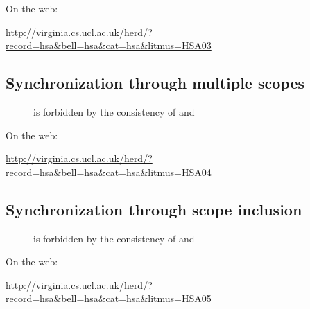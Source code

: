 \documentclass[a4paper]{article}
\begin{document}
On the web:

\url{http://virginia.cs.ucl.ac.uk/herd/?record=hsa&bell=hsa&cat=hsa&litmus=HSA03}

\pagebreak

\subsection{\label{ex04}Synchronization through multiple scopes}


\begin{figure}[htp]
\begin{center}\moveback{}
\end{center}
\caption{\label{hsa04}  is forbidden by the consistency
of \hhb{} and \coh{} \color{red}{(Forbidden)}}
\end{figure}

On the web:

\url{http://virginia.cs.ucl.ac.uk/herd/?record=hsa&bell=hsa&cat=hsa&litmus=HSA04}

\pagebreak

\subsection{Synchronization through scope inclusion}


\begin{figure}[htp]
\begin{center}\moveback{}
\end{center}
\caption{\label{hsa05}  is forbidden by the consistency
of \hhb{} and \coh{} \color{red}{(Forbidden)}}
\end{figure}

On the web:

\url{http://virginia.cs.ucl.ac.uk/herd/?record=hsa&bell=hsa&cat=hsa&litmus=HSA05}

\pagebreak
\end{document}
